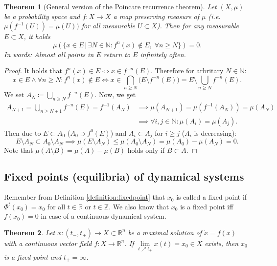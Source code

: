 \documentclass[hidelinks,a4paper, 11pt]{article}
\theoremstyle{plain}
\newtheorem{theorem}{Theorem}
\theoremstyle{break}
\theoremstyle{plain}
\theoremstyle{definition}
\begin{document}
\begin{theorem}[General version of the Poincare recurrence theorem]
	Let $(X, \mu)$ be a probability space and $f: X \to X$ a map preserving measure of $\mu$ (i.e. $\mu(f^{-1}(U)) = \mu(U))$ for all measurable $U \subset X$). Then for any measurable $E \subset X$, it holds
	\[
		\mu(\{ x \in E \, | \, \exists N \in \mathbb N: f^n(x) \notin E,  \; \forall n \geq N \}) = 0.
	\]
	In words: Almost all points in $E$ return to $E$ infinitely often.
\end{theorem}

\begin{proof}
	It holds that $f^n(x) \in E \iff x \in f^{-n}(E)$. Therefore for arbritary $N \in \mathbb N$:
	\[
		x \in E \land \forall n \geq N: f^{n}(x) \notin E \iff x \in \bigcap\limits_{n \geq N} \big(E \setminus f^{-n}(E)\big) = E \setminus \bigcup\limits_{n \geq N} f^{-n}(E).
	\]
	We set $A_N \coloneqq \bigcup_{n \geq N}f^{-n}(E)$. Now, we get
	\begin{align*}
		A_{N+1} = \bigcup_{n \geq N+1} f^{-n}(E) = f^{-1}(A_N) &\implies \mu(A_{N+1}) = \mu(f^{-1}(A_N)) = \mu(A_N)\\ 
		& \implies \forall i,j \in \mathbb N:  \mu(A_i) = \mu(A_j).
	\end{align*}
	Then due to $E \subset A_0$ ($A_0 \supset f^0(E)$) and $A_i \subset A_j$ for  $i \geq j$ ($A_i$ is decreasing):
	\[
		E \setminus A_N \subset A_0 \setminus A_N \implies \mu(E \setminus A_N) \leq \mu(A_0 \setminus A_N) = \mu(A_0) - \mu(A_N) = 0.
	\]
	Note that $\mu(A \setminus B) = \mu(A) - \mu(B)$ holds only if $B \subset A$.
\end{proof}

\subsection{Fixed points (equilibria) of dynamical systems}

Remember from Definition \ref{definition:fixedpoint} that $x_0$ is called a fixed point if $\Phi^t(x_0) = x_0$ for all $t \in \mathbb R$ or $t \in \mathbb Z$. We also know that $x_0$ is a fixed point iff $f(x_0) = 0$ in case of a continuous dynamical system.

\begin{theorem}
	Let $x: (t_-,t_+) \to X \subset \mathbb R^n$ be a maximal solution of $\dot x = f(x)$ with a continuous vector field $f: X \to \mathbb R^n$. If $\lim\limits_{t \nearrow t_+}x(t) = x_0 \in X$ exists, then $x_0$ is a fixed point and $t_+ = \infty$.
\end{theorem}
\end{document}

